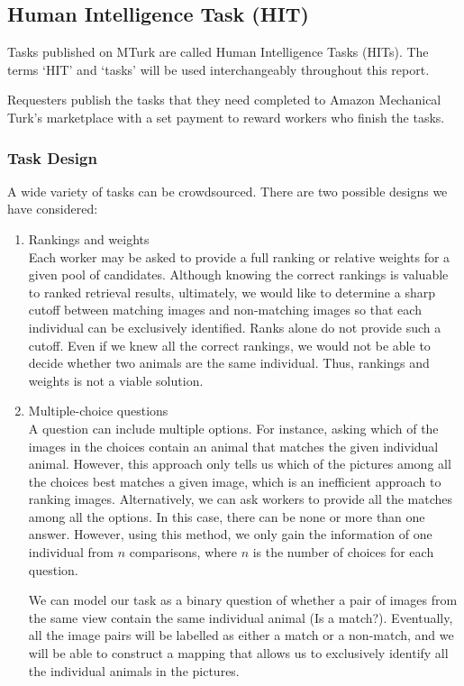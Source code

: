   \subsection{Human Intelligence Task (HIT)}

  Tasks published on MTurk are called Human Intelligence Tasks (HITs). The terms
  `HIT' and `tasks' will be used interchangeably throughout this report.

  Requesters publish the tasks that they need completed to Amazon Mechanical
  Turk's marketplace with a set payment to reward workers who finish the tasks.

  \subsubsection{Task Design}

  A wide variety of tasks can be crowdsourced. There are two possible designs we
  have considered:
  \begin{enumerate}
	\item Rankings and weights \\
    Each worker may be asked to provide a full ranking or relative weights
    for a given pool of candidates. Although knowing the correct rankings is
    valuable to ranked retrieval results,
    ultimately, we would like to determine a sharp cutoff between matching
    images and non-matching images so that each individual can be exclusively
    identified. Ranks alone do not provide such a cutoff. Even if we knew all the
    correct rankings, we would not be able to decide whether two animals are
    the same individual. Thus, rankings and weights is not a viable
    solution.
	\item Multiple-choice questions \\
    A question can include multiple options. For instance, asking which of the images
    in the choices contain an animal that matches the given individual
    animal. However, this approach only tells us which of the pictures among
    all the choices best matches a given image, which is an inefficient
    approach to ranking images. Alternatively, we can ask workers to provide
    all the matches among all the options. In this case, there can be none or
    more than one answer. However, using this method, we only gain the
    information of one individual from $n$ comparisons, where $n$ is the number
    of choices for each question.

    We can model our task as a binary question of whether a pair of images from
    the same view contain the same individual animal (Is a match?).
    Eventually, all the image pairs will be labelled as either a match or a
    non-match, and we will be able to construct a mapping that allows us to
    exclusively identify all the individual animals in the pictures.
  \end{enumerate}

